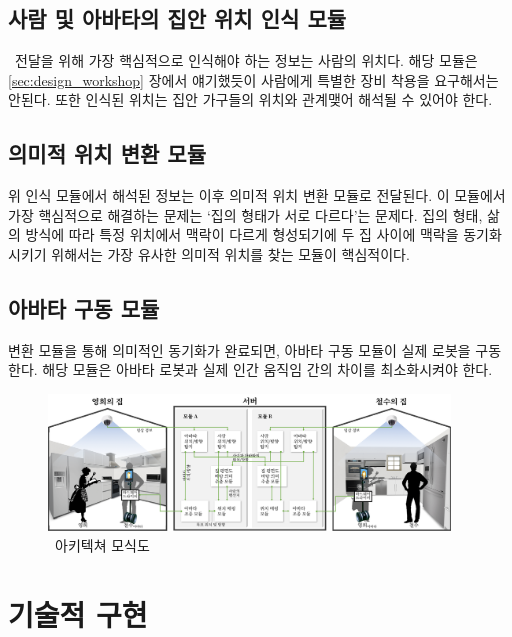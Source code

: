 \subsection{사람 및 아바타의 집안 위치 인식 모듈}
\sysname\이 \concept\ 전달을 위해 가장 핵심적으로 인식해야 하는 정보는 사람의 위치다. 해당 모듈은 \ref{sec:design_workshop} 장에서 얘기했듯이 사람에게 특별한 장비 착용을 요구해서는 안된다. 또한 인식된 위치는 집안 가구들의 위치와 관계맺어 해석될 수 있어야 한다. 

\subsection{의미적 위치 변환 모듈}
위 인식 모듈에서 해석된 정보는 이후 의미적 위치 변환 모듈로 전달된다. 이 모듈에서 가장 핵심적으로 해결하는 문제는 `집의 형태가 서로 다르다'는 문제다. 집의 형태, 삶의 방식에 따라 특정 위치에서 맥락이 다르게 형성되기에 두 집 사이에 맥락을 동기화 시키기 위해서는 가장 유사한 의미적 위치를 찾는 모듈이 핵심적이다. 

\subsection{아바타 구동 모듈}
변환 모듈을 통해 의미적인 동기화가 완료되면, 아바타 구동 모듈이 실제 로봇을 구동한다. 해당 모듈은 아바타 로봇과 실제 인간 움직임 간의 차이를 최소화시켜야 한다. 


\begin{figure}
\centering
\includegraphics[width=0.95\textwidth]{images/architecture}
\caption{\sysname\ 아키텍쳐 모식도}
\label{fig:architecture}
\end{figure}


\section{ 기술적 구현}
\label{sec:system_implementation}


